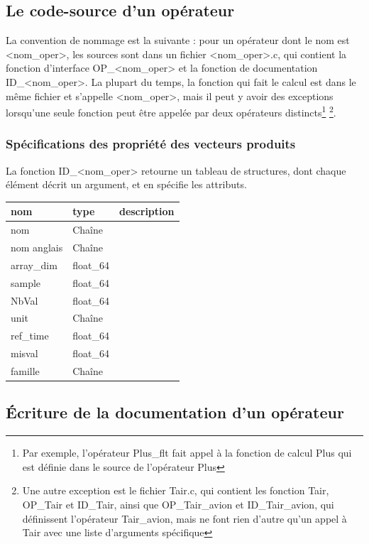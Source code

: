 \subsection{Le code-source d'un opérateur}
La convention de nommage est la suivante : pour un opérateur
dont le nom est <nom\_oper>, les sources sont dans un
fichier <nom\_oper>.c, qui contient la fonction d'interface
OP\_<nom\_oper> et la fonction de documentation ID\_<nom\_oper>.
La plupart du temps, la fonction qui fait le calcul est dans le
même fichier et s'appelle  <nom\_oper>, mais il peut y avoir
des exceptions lorsqu'une seule fonction peut être appelée
par deux opérateurs distincts\footnote{Par exemple, l'opérateur
Plus\_flt fait appel à la fonction de calcul Plus qui est
définie dans le source de l'opérateur Plus}
\footnote{Une autre exception est le fichier Tair.c, qui 
contient les fonction Tair, OP\_Tair et ID\_Tair, 
ainsi que OP\_Tair\_avion et ID\_Tair\_avion, qui définissent
l'opérateur Tair\_avion, mais ne font rien d'autre qu'un appel
à Tair avec une liste d'arguments spécifique}.


\subsubsection{Spécifications des propriété des vecteurs produits}
    La fonction ID\_<nom\_oper> retourne un tableau de structures,
dont chaque élément décrit un argument, et en spécifie les
attributs.

\begin{tabular}{l|l|l}
 nom          & type   & description  \\
\hline
nom	& Chaîne & \\
\hline
nom anglais	& Chaîne & \\
\hline
array\_dim	& float\_64 & \\
\hline
sample	& float\_64 & \\
\hline
NbVal	& float\_64 & \\
\hline
unit	& Chaîne & \\
\hline
ref\_time	& float\_64 & \\
\hline
misval	& float\_64 & \\
\hline
famille	& Chaîne & \\
\hline
\end{tabular}

\subsection{Écriture de la documentation d'un opérateur}

